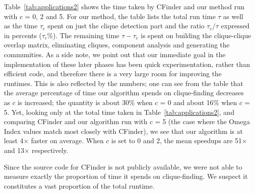 Table~\ref{tab:applications2} shows the time taken by CFinder and our method 
run with $c$ = 0, 2 and 5. For our method, the table lists the total run time $\tau$ 
as well as the time $\tau_c$ spent on just the clique detection part and the ratio
${\tau_c}/{\tau}$ expressed in percents ($\tau_c$\%).
The remaining time $\tau - \tau_c$ is spent on building the clique-clique overlap matrix, eliminating cliques, component analysis and generating the communities.  As a side note,
we point out that our immediate goal in the implementation of these later phases has been quick experimentation, rather than efficient code, and therefore there is a very large room for improving the runtimes. This is also reflected by the numbers; one can see from the table that the average percentage of time our algorithm spends on clique-finding decreases as $c$ is increased; the quantity is about 30$\%$ when $c$ = 0 and about 16$\%$ when $c$ = 5. Yet, looking only at the total time taken in Table~\ref{tab:applications2}, and comparing CFinder and our algorithm run with $c$ = 5 (the case where the Omega Index values match most closely with CFinder), we see that our algorithm is at least 4$\times$ faster on average. When $c$ is set to 0 and 2, the mean speedups are 51$\times$ and 13$\times$ respectively. 

Since the source code for CFinder is not publicly available, we were not able to measure exactly the proportion of time it spends on clique-finding. 
We suspect it constitutes a vast proportion of the total runtime.




